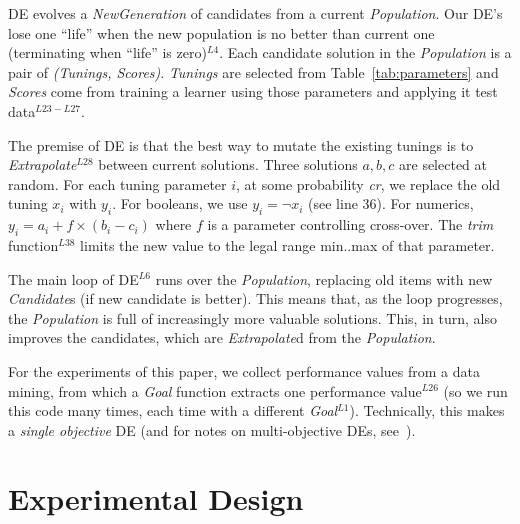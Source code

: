 \documentclass[final,twocolumn,5p]{elsarticle}
\newcommand{\tab}[1]{Table~\ref{tab:#1}}
\begin{document}
DE evolves a {\em NewGeneration} of candidates  from
a current {\em Population}.  Our DE's lose one ``life''
when the new population is no better than  current one (terminating when ``life'' is zero)$^{L4}$.
Each candidate solution in the {\em Population}  
is a pair of {\em (Tunings, Scores)}.  {\em Tunings} are selected from
\tab{parameters} and {\em Scores} come from training a learner using those parameters
and applying it     test data$^{L23-L27}$.

The premise of DE  is that the best way to mutate the existing tunings
is to {\em Extrapolate}$^{L28}$
between current solutions.  Three solutions $a,b,c$ are selected at random.
For each tuning parameter $i$, at some probability {\em cr}, we replace
the old tuning $x_i$ with $y_i$. For booleans, we use $y_i= \neg x_i$ (see line 36). For numerics, $y_i = a_i+f \times (b_i - c_i)$   where $f$ is a parameter
controlling  cross-over.  The {\em trim} function$^{L38}$ limits the new
value to the legal range min..max of that parameter.
 
The main loop of DE$^{L6}$ runs over the {\em Population}, replacing old items
with new {\em Candidate}s (if  new candidate is better).
This means that, as the loop progresses, the {\em Population} is full of increasingly
more valuable solutions. This, in turn, also improves  the candidates, which are {\em Extrapolate}d
from the {\em Population}.

For the experiments of this paper, we collect performance
values from a data mining, from which a {\em Goal} function extracts one 
performance value$^{L26}$ (so we run this code many times, each time with
a different {\em Goal}$^{L1}$).  Technically, this makes a  {\em single objective} DE (and for notes on multi-objective DEs, see~\cite{Coello05,zhang07,5583335}).






\section{Experimental Design}\label{sect:design}
 
\end{document}
